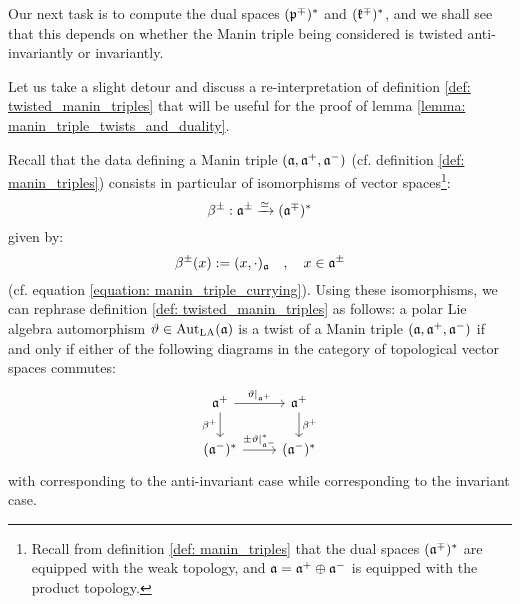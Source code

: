         Our next task is to compute the dual spaces $(\mathfrak{p}^{\mp})^*$ and $(\mathfrak{k}^{\mp})^*$, and we shall see that this depends on whether the Manin triple being considered is twisted anti-invariantly or invariantly.
        \begin{remark} \label{remark: manin_triple_twists_via_currying}
            Let us take a slight detour and discuss a re-interpretation of definition \ref{def: twisted_manin_triples} that will be useful for the proof of lemma \ref{lemma: manin_triple_twists_and_duality}.
        
            Recall that the data defining a Manin triple $(\mathfrak{a}, \mathfrak{a}^+, \mathfrak{a}^-)$ (cf. definition \ref{def: manin_triples}) consists in particular of isomorphisms of vector spaces\footnote{Recall from definition \ref{def: manin_triples} that the dual spaces $(\mathfrak{a}^{\mp})^*$ are equipped with the weak topology, and $\mathfrak{a} = \mathfrak{a}^+ \oplus \mathfrak{a}^-$ is equipped with the product topology.}:
                $$\beta^{\pm}: \mathfrak{a}^{\pm} \xrightarrow[]{\simeq} (\mathfrak{a}^{\mp})^*$$
            given by:
                $$\beta^{\pm}(x) := (x, \cdot)_{\mathfrak{a}} \quad, \quad x \in \mathfrak{a}^{\pm}$$
            (cf. equation \eqref{equation: manin_triple_currying}). Using these isomorphisms, we can rephrase definition \ref{def: twisted_manin_triples} as follows: a polar Lie algebra automorphism $\vartheta \in \operatorname{Aut}_{\mathrm{LA}}(\mathfrak{a})$ is a twist of a Manin triple $(\mathfrak{a}, \mathfrak{a}^+, \mathfrak{a}^-)$ if and only if either of the following diagrams in the category of topological vector spaces commutes:
                \begin{equation} \label{diagram: manin_triple_polar_twist_currying}
                    \begin{tikzcd}
                    	{\a^+} & {\a^+} \\
                    	{(\a^-)^*} & {(\a^-)^*}
                    	\arrow["\vartheta|_{\a^+}", from=1-1, to=1-2]
                    	\arrow["{\beta^+}"', from=1-1, to=2-1]
                    	\arrow["{\beta^+}", from=1-2, to=2-2]
                    	\arrow["{\pm \vartheta|_{\a^-}^*}", from=2-1, to=2-2]
                    \end{tikzcd}
                \end{equation}
            with \say{$-\vartheta^*$} corresponding to the anti-invariant case while \say{$\vartheta^*$} corresponding to the invariant case.


\end{remark}
